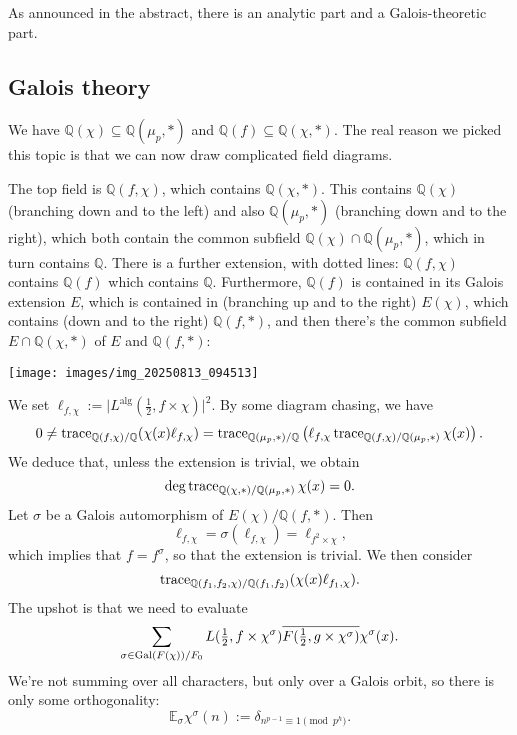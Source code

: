 \documentclass[reqno]{amsart} 
\begin{document}
As announced in the abstract, there is an analytic part and a Galois-theoretic part.

\subsection{Galois theory}
We have $\mathbb{Q}(\chi) \subseteq \mathbb{Q}(\mu_p, \ast)$ and $\mathbb{Q}(f) \subseteq \mathbb{Q}(\chi, \ast)$.  The real reason we picked this topic is that we can now draw complicated field diagrams.

The top field is $\mathbb{Q}(f, \chi)$, which contains $\mathbb{Q}(\chi, \ast)$.  This contains $\mathbb{Q}(\chi)$ (branching down and to the left) and also $\mathbb{Q}(\mu_p , \ast)$ (branching down and to the right), which both contain the common subfield $\mathbb{Q}(\chi) \cap \mathbb{Q}(\mu_p, \ast)$, which in turn contains $\mathbb{Q} $.  There is a further extension, with dotted lines: $\mathbb{Q}(f, \chi)$ contains $\mathbb{Q}(f)$ which contains $\mathbb{Q}$.  Furthermore, $\mathbb{Q}(f)$ is contained in its Galois extension $E$, which is contained in (branching up and to the right) $E(\chi)$, which contains (down and to the right) $\mathbb{Q}(f, \ast)$, and then there's the common subfield $E \cap \mathbb{Q}(\chi, \ast)$ of $E$ and $\mathbb{Q}(f, \ast)$:

\texttt{[image: images/img\_20250813\_094513]}

We set $\ell_{f, \chi} := \lvert L^{\mathrm{alg}}(\tfrac{1}{2}, f \times \chi) \rvert^2$.  By some diagram chasing, we have
\begin{equation*}
  0 \neq \operatorname{trace}_{\mathbb{Q}(f, \chi) / \mathbb{Q}}(\chi(x) \ell_{f, \chi})
  = \operatorname{trace}_{\mathbb{Q}(\mu_p, \ast) / \mathbb{Q}} \left( \ell_{f, \chi} \operatorname{trace}_{\mathbb{Q}(f, \chi) / \mathbb{Q}(\mu_p, \ast)} \chi(x) \right).
\end{equation*}
We deduce that, unless the extension is trivial, we obtain
\begin{equation*}
  \deg \operatorname{trace}_{\mathbb{Q}(\chi, \ast) / \mathbb{Q}(\mu_p, \ast)} \chi(x) = 0.
\end{equation*}
Let $\sigma$ be a Galois automorphism of $E(\chi) / \mathbb{Q}(f, \ast)$.  Then
\begin{equation*}
  \ell_{f, \chi} = \sigma(\ell_{f, \chi}) = \ell_{f^2 \times \chi},
\end{equation*}
which implies that $f = f^\sigma$, so that the extension is trivial.  We then consider
\begin{equation*}
  \operatorname{trace}_{\mathbb{Q}(f_1, f_2, \chi) / \mathbb{Q}(f_1, f_2)}(\chi(x) \ell_{f_1, \chi}).
\end{equation*}
The upshot is that we need to evaluate
\begin{equation}\label{eq:cq6v8d8hcu}
  \sum_{\sigma \in \operatorname{Gal}(F(\chi)) / F_0}
  L(\tfrac{1}{2}, f \times \chi^\sigma) \overline{F(\tfrac{1}{2}, g \times \chi^\sigma)} \chi^\sigma(x).
\end{equation}
We're not summing over all characters, but only over a Galois orbit, so there is only some orthogonality:
\begin{equation*}
  \mathbb{E}_{\sigma} \chi^\sigma(n) := \delta_{n^{p - 1} \equiv 1 \pmod{p^{h}}}.
\end{equation*}
\end{document}
